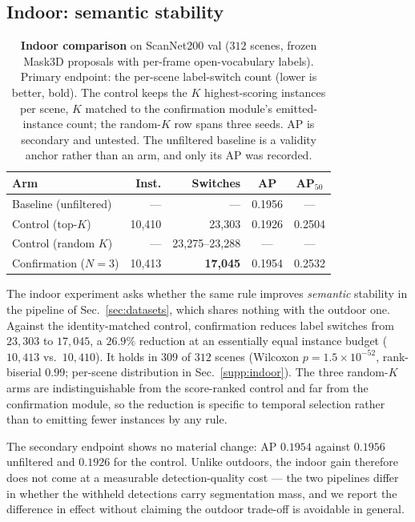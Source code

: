 \subsection{Indoor: semantic stability}
\label{sec:indoor}



\begin{table}[tb]
\centering\footnotesize
\setlength{\tabcolsep}{2pt}
\begin{tabular}{lrrcc}
\toprule
Arm & Inst. & Switches & AP & AP$_{50}$ \\
\midrule
Baseline (unfiltered)  & --- & --- & 0.1956 & --- \\
Control (top-$K$)      & 10{,}410 & 23{,}303 & 0.1926 & 0.2504 \\
Control (random $K$)   & --- & 23{,}275--23{,}288 & --- & --- \\
Confirmation ($N{=}3$) & 10{,}413 & \textbf{17{,}045} & 0.1954 & 0.2532 \\
\bottomrule
\end{tabular}
\caption{\textbf{Indoor comparison} on ScanNet200 val ($312$ scenes, frozen
Mask3D proposals with per-frame open-vocabulary labels). Primary endpoint: the
per-scene label-switch count (lower is better, bold). The control keeps the $K$
highest-scoring instances per scene, $K$ matched to the confirmation module's
emitted-instance count; the random-$K$ row spans three seeds. AP is secondary
and untested. The unfiltered baseline is a validity anchor rather than an arm,
and only its AP was recorded.}
\label{tab:indoor}
\end{table}

The indoor experiment asks whether the same rule improves \emph{semantic}
stability in the pipeline of Sec.~\ref{sec:datasets}, which shares nothing with
the outdoor one. Against the identity-matched control, confirmation reduces label
switches from $23{,}303$ to $17{,}045$, a $26.9\%$ reduction at an essentially
equal instance budget ($10{,}413$ vs.\ $10{,}410$). It holds in $309$ of $312$ scenes (Wilcoxon
$p{=}1.5{\times}10^{-52}$, rank-biserial $0.99$; per-scene distribution in
Sec.~\ref{supp:indoor}). The three random-$K$ arms are
indistinguishable from the score-ranked control and far from the confirmation
module, so the reduction is specific to temporal selection rather than to
emitting fewer instances by any rule.

The secondary endpoint shows no material change: AP $0.1954$ against $0.1956$
unfiltered and $0.1926$ for the control. Unlike outdoors, the indoor gain
therefore does not come at a measurable detection-quality cost --- the two
pipelines differ in whether the withheld detections carry segmentation mass,
and we report the difference in effect without claiming the outdoor trade-off
is avoidable in general.

